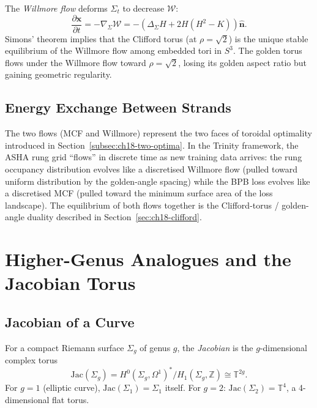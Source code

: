 The \emph{Willmore flow} deforms $\Sigma_t$ to decrease $\mathcal{W}$:
\begin{equation}\label{eq:willmore-flow}
  \frac{\partial \mathbf{x}}{\partial t} = -\nabla_\Sigma \mathcal{W}
  = -\left(\Delta_\Sigma H + 2H(H^2-K)\right)\hat{\mathbf{n}}.
\end{equation}
Simons' theorem implies that the Clifford torus (at $\rho = \sqrt{2}$) is the unique
stable equilibrium of the Willmore flow among embedded tori in $S^3$.
The golden torus flows under the Willmore flow toward $\rho = \sqrt{2}$, losing its
golden aspect ratio but gaining geometric regularity.

\subsection{Energy Exchange Between Strands}\label{subsec:ch18-energy-exchange}

The two flows (MCF and Willmore) represent the two faces of toroidal optimality
introduced in Section~\ref{subsec:ch18-two-optima}.
In the Trinity framework, the ASHA rung grid ``flows'' in discrete time as new
training data arrives: the rung occupancy distribution evolves like a discretised
Willmore flow (pulled toward uniform distribution by the golden-angle spacing) while
the BPB loss evolves like a discretised MCF (pulled toward the minimum surface area
of the loss landscape).
The equilibrium of both flows together is the Clifford-torus / golden-angle duality
described in Section~\ref{sec:ch18-clifford}.

\section{Higher-Genus Analogues and the Jacobian Torus}
\label{sec:ch18-higher-genus}

\subsection{Jacobian of a Curve}\label{subsec:ch18-jacobian}

For a compact Riemann surface $\Sigma_g$ of genus $g$, the \emph{Jacobian} is the
$g$-dimensional complex torus
\begin{equation}\label{eq:jacobian}
  \mathrm{Jac}(\Sigma_g) = H^0(\Sigma_g, \Omega^1)^* / H_1(\Sigma_g, \mathbb{Z}) \cong \mathbb{T}^{2g}.
\end{equation}
For $g = 1$ (elliptic curve), $\mathrm{Jac}(\Sigma_1) = \Sigma_1$ itself.
For $g = 2$: $\mathrm{Jac}(\Sigma_2) = \mathbb{T}^4$, a 4-dimensional flat torus.


